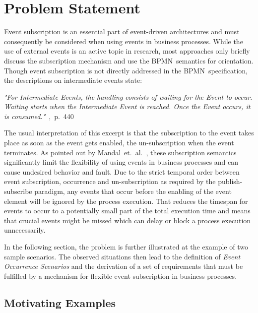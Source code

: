 \chapter{Problem Statement}\label{ch:problemstatement}

Event subscription is an essential part of event-driven architectures and must consequently be considered when using events in business processes.
While the use of external events is an active topic in research, most approaches only briefly discuss the subscription mechanism and use the \acs{BPMN}~semantics for orientation.
Though event subscription is not directly addressed in the BPMN~specification, the descriptions on intermediate events state:

\medskip
\textit{"For Intermediate Events, the handling consists of waiting for the Event to occur. Waiting starts when the
Intermediate Event is reached. Once the Event occurs, it is consumed."}~\cite{bpmnspec},~p.~440

\medskip \noindent The usual interpretation of this excerpt is that the subscription to the event takes place as soon as the event gets enabled, the un-subscription when the event terminates.
As pointed out by Mandal~et.~al.~\cite{mandal:2017}, these subscription semantics significantly limit the flexibility of using events in business processes and can cause undesired behavior and fault.
Due to the strict temporal order between event subscription, occurrence and un-subscription as required by the publish-subscribe paradigm, any events that occur before the enabling of the event element will be ignored by the process execution.
That reduces the timespan for events to occur to a potentially small part of the total execution time and means that crucial events might be missed which can delay or block a process execution unnecessarily.

In the following section, the problem is further illustrated at the example of two sample scenarios.
The observed situations then lead to the definition of \textit{Event Occurrence Scenarios} and the derivation of a set of requirements that must be fulfilled by a mechanism for flexible event subscription in business processes.

\section{Motivating Examples}\label{ch:motivatingexamples}

